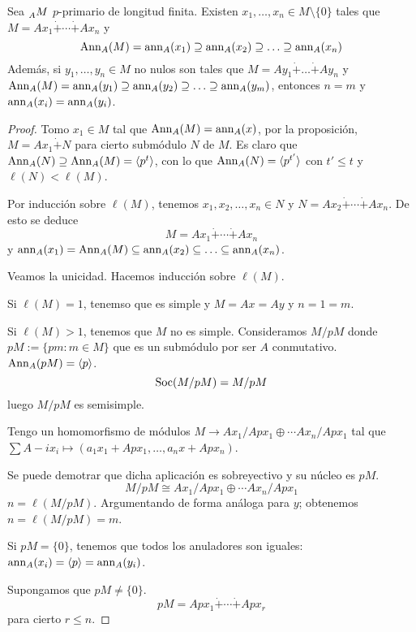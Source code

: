 \begin{teo}
  Sea \(\prescript{}{A}{M}\) \(p\)-primario de longitud finita. Existen
  \(x_1,\ldots, x_n\in M\setminus\{0\}\) tales
  que \(M=Ax_1\dot{+}\cdots\dot{+} Ax_n\) y
  \[
    \operatorname{Ann}_A(M)=\operatorname{ann}_A(x_1)\supseteq\operatorname{ann}_A(x_2)\supseteq\ldots
    \supseteq\operatorname{ann}_A(x_n)
  \]
  Además, si \(y_1,\ldots, y_n\in M\) no nulos son tales que
  \(
    M=Ay_1\dot{+}\ldots\dot{+} Ay_n
  \)
  y
  \(
    \operatorname{Ann}_A(M)=\operatorname{ann}_A(y_1)\supseteq\operatorname{ann}_A(y_2)\supseteq\ldots
    \supseteq\operatorname{ann}_A(y_m)
  \), entonces \(n=m\) y \(\operatorname{ann}_A(x_i)=\operatorname{ann}_A(y_i)\).
\end{teo}
\begin{proof}
  Tomo \(x_1\in M\) tal que \(\operatorname{Ann}_A(M)=\operatorname{ann}_A(x)\), por la proposición,
  \(M=Ax_1\dot{+} N\) para cierto submódulo \(N\) de \(M\).
  Es claro que \(\operatorname{Ann}_A(N)\supseteq\operatorname{Ann}_A(M)=\langle p^t\rangle\),
  con lo que \(\operatorname{Ann}_A(N)=\langle p^{t'}\rangle\) con \(t'\le t\) y
  \(\ell(N)<\ell(M)\).

  Por inducción sobre \(\ell(M)\), tenemos \(x_1,x_2,\ldots, x_n\in N\)
  y \(N=Ax_2\dot{+}\cdots\dot{+} Ax_n\).
  De esto se deduce
  \[
    M=Ax_1\dot{+}\cdots\dot{+} Ax_n
  \]
  y \(\operatorname{ann}_A(x_1)=\operatorname{Ann}_A(M)\subseteq\operatorname{ann}_A(x_2)\subseteq\ldots\subseteq
  \operatorname{ann}_A(x_n)\).

  Veamos la unicidad. Hacemos inducción sobre \(\ell(M)\).

  Si \(\ell(M)=1\), tenemso que es simple y \(M=Ax=Ay\) y \(n=1=m\).

  Si \(\ell(M)>1\), tenemos que \(M\) no es simple. Consideramos
  \(M/pM\) donde \(pM:=\{pm:m\in M\}\) que es un submódulo por ser
  \(A\) conmutativo. \(\operatorname{Ann}_A(pM)=\langle p\rangle\).
  \[
    \operatorname{Soc}(M/pM)=M/pM
  \]
  luego \(M/pM\) es semisimple.

  Tengo un homomorfismo de módulos \(M\longrightarrow
  Ax_1/Apx_1\oplus\cdots
  Ax_n/Apx_1
  \) tal que \(\sum A-ix_i\mapsto (a_1 x_1+Apx_1,\ldots,
  a_n x+Apx_n)\).

  Se puede demotrar que dicha aplicación es sobreyectivo y su núcleo es
  \(pM\).
  \[
    M/pM\cong
    Ax_1/Apx_1\oplus\cdots
    Ax_n/Apx_1
  \]
  \(n = \ell(M/pM)\). Argumentando de forma análoga para \(y\);
  obtenemos \(n= \ell(M/pM)=m\).

  Si \(pM=\{0\}\), tenemos que todos los anuladores son iguales:
  \(\operatorname{ann}_A(x_i)=\langle p\rangle=\operatorname{ann}_A(y_i)\).

  Supongamos que \(pM\neq\{0\}\).
  \[
    pM=Apx_1\dot{+}\cdots\dot{+} Apx_r
  \]
  para cierto \(r\le n\).


\end{proof}
